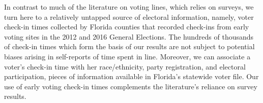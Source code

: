 \documentclass[12pt,titlepage]{article}
\begin{document}


In contrast to much of the literature on voting lines, which relies on
surveys, we turn here to a relatively untapped source of electoral
information, namely, voter check-in times collected by Florida
counties that recorded check-ins from early voting sites in the 2012
and 2016 General Elections.  The hundreds of thousands of check-in
times which form the basis of our results are not subject to potential
biases arising in self-reports of time spent in line.  Moreover, we
can associate a voter's check-in time with her race/ethnicity, party
registration, and electoral participation, pieces of information
available in Florida's statewide voter file.  Our use of early voting
check-in times complements the literature's reliance on survey
results.
 

\end{document}

